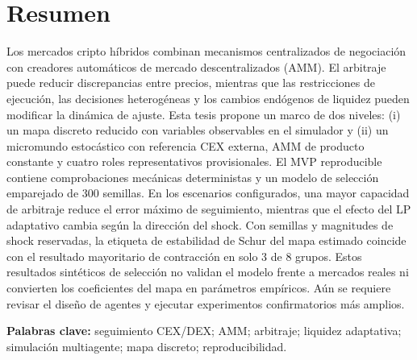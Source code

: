 \section{Resumen}

Los mercados cripto híbridos combinan mecanismos centralizados de negociación con
creadores automáticos de mercado descentralizados (AMM). El arbitraje puede reducir
discrepancias entre precios, mientras que las restricciones de ejecución, las
decisiones heterogéneas y los cambios endógenos de liquidez pueden modificar la
dinámica de ajuste. Esta tesis propone un marco de dos niveles: (i) un mapa discreto
reducido con variables observables en el simulador y (ii) un micromundo estocástico con
referencia CEX externa, AMM de producto constante y cuatro roles representativos
provisionales. El MVP reproducible contiene comprobaciones mecánicas deterministas y
un modelo de selección emparejado de 300 semillas. En los escenarios configurados, una
mayor capacidad de arbitraje reduce el error máximo de seguimiento, mientras que el
efecto del LP adaptativo cambia según la dirección del shock. Con semillas y magnitudes
de shock reservadas, la etiqueta de estabilidad de Schur del mapa estimado coincide con
el resultado mayoritario de contracción en solo 3 de 8 grupos. Estos resultados
sintéticos de selección no validan el modelo frente a mercados reales ni convierten los
coeficientes del mapa en parámetros empíricos. Aún se requiere revisar el diseño de
agentes y ejecutar experimentos confirmatorios más amplios.

\textbf{Palabras clave:} seguimiento CEX/DEX; AMM; arbitraje; liquidez adaptativa;
simulación multiagente; mapa discreto; reproducibilidad.
